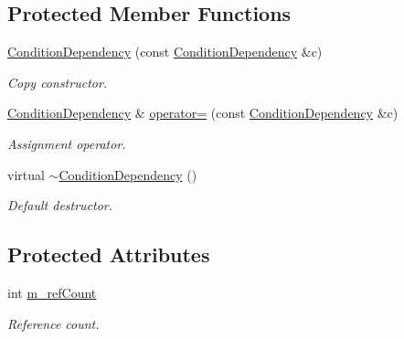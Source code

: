 \subsection*{Protected Member Functions}
\begin{DoxyCompactItemize}
\item 
\hyperlink{class_d_d4hep_1_1_conditions_1_1_condition_dependency_ac121f9859fa375681429907880f99bc0}{ConditionDependency} (const \hyperlink{class_d_d4hep_1_1_conditions_1_1_condition_dependency}{ConditionDependency} \&c)
\begin{DoxyCompactList}\small\item\em Copy constructor. \item\end{DoxyCompactList}\item 
\hyperlink{class_d_d4hep_1_1_conditions_1_1_condition_dependency}{ConditionDependency} \& \hyperlink{class_d_d4hep_1_1_conditions_1_1_condition_dependency_ac1f45d820f6c9dc85e453aa3c3a1cd27}{operator=} (const \hyperlink{class_d_d4hep_1_1_conditions_1_1_condition_dependency}{ConditionDependency} \&c)
\begin{DoxyCompactList}\small\item\em Assignment operator. \item\end{DoxyCompactList}\item 
virtual \hyperlink{class_d_d4hep_1_1_conditions_1_1_condition_dependency_ae92b62f4f395a37f0acbf30f797ccdcd}{$\sim$ConditionDependency} ()
\begin{DoxyCompactList}\small\item\em Default destructor. \item\end{DoxyCompactList}\end{DoxyCompactItemize}
\subsection*{Protected Attributes}
\begin{DoxyCompactItemize}
\item 
int \hyperlink{class_d_d4hep_1_1_conditions_1_1_condition_dependency_a0962b46c90825f3ee632af2a25520639}{m\_\-refCount}
\begin{DoxyCompactList}\small\item\em Reference count. \item\end{DoxyCompactList}\end{DoxyCompactItemize}



